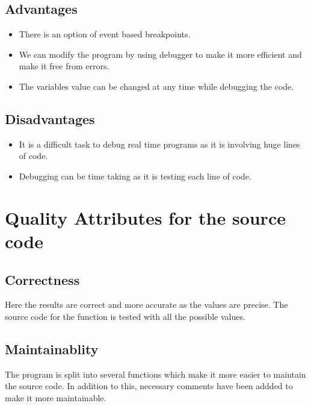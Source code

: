 \documentclass[12pt]{report}
\begin{document}
\subsection{\Large Advantages}

\begin{itemize}
    \item There is an option of event based breakpoints.
    \item We can modify the program by using debugger to make it more efficient and make it free from errors.
    \item The variables value can be changed at any time while debugging the code.

\end{itemize}

\subsection{\Large Disadvantages}
\begin{itemize}
    \item It is a difficult task to debug real time programs as it is involving huge lines of code.
    \item Debugging can be time taking as it is testing each line of code.
\end{itemize}

\section{\Large \vspace{0.2 cm}Quality Attributes for the source code }


\subsection{\Large\vspace{0.2 cm}Correctness}
Here the results are correct and more accurate as the values are precise. The source code for the function is tested with all the possible values.

\subsection{\Large \vspace{0.2 cm}Maintainablity}
The program is split into several functions which make it more easier to maintain the source code. In addition to this, necessary comments have been addded to make it more maintainable.
\end{document}
